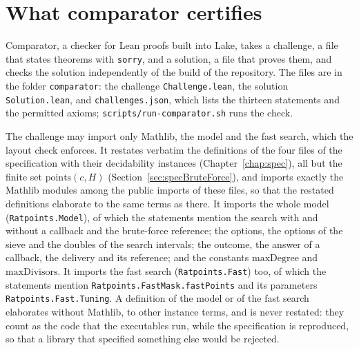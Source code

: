 \section{What comparator certifies}\label{sec:comparator}

Comparator, a checker for Lean proofs built into Lake, takes a challenge, a file that states
theorems with \verb|sorry|, and a solution, a file that proves them, and checks the solution
independently of the build of the repository. The files are in the folder \verb|comparator|: the
challenge \verb|Challenge.lean|, the solution \verb|Solution.lean|, and \verb|challenges.json|,
which lists the thirteen statements and the permitted axioms; \verb|scripts/run-comparator.sh| runs
the check.

The challenge may import only Mathlib, the model and the fast search, which the layout check
enforces. It restates verbatim the definitions of the four files of the specification with their
decidability instances (Chapter~\ref{chap:spec}), all but the finite set $\mathrm{points}(c, H)$
(Section~\ref{sec:specBruteForce}), and imports exactly the Mathlib modules among the public imports
of these files, so that the restated definitions elaborate to the same terms as there. It imports
the whole model (\verb|Ratpoints.Model|), of which the statements mention the search with and
without a callback and the brute-force reference; the options, the options of the sieve and the
doubles of the search intervals; the outcome, the answer of a callback, the delivery and its
reference; and the constants $\mathrm{maxDegree}$ and $\mathrm{maxDivisors}$. It imports the fast
search (\verb|Ratpoints.Fast|) too, of which the statements mention
\verb|Ratpoints.FastMask.fastPoints| and its parameters \verb|Ratpoints.Fast.Tuning|. A definition
of the model or of the fast search elaborates without Mathlib, to other instance terms, and is never
restated: they count as the code that the executables run, while the specification is reproduced, so
that a library that specified something else would be rejected.

